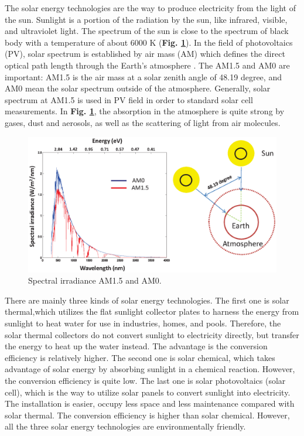\documentclass[a4paper, 12pt, titlepage,oneside,drop]{kthesis}
\begin{document}
The solar energy technologies are the way to produce electricity from the light of the sun. Sunlight is a portion of the radiation by the sun, like infrared, visible,
and ultraviolet light. The spectrum of the sun is close to the spectrum of black body with a temperature of about 6000 K (\textbf{Fig. \ref{spectrumsun}}). In the field of photovoltaics (PV), solar spectrum is established
by air mass (AM) which defines the direct optical path length through the Earth's atmosphere \cite{smestad2002optoelectronics}. The AM1.5 and AM0 are important: AM1.5 is the air mass at a solar zenith angle of 48.19 degree, and AM0 mean the solar spectrum 
outside of the atmosphere. Generally, solar spectrum at AM1.5 is used in PV field in order to standard solar cell measurements. In \textbf{Fig. \ref{spectrumsun}}, the absorption in the atmosphere is quite strong by gases,
dust and aerosols, as well as the scattering of light from air molecules.

\begin{figure}[H]
\centering
\includegraphics[scale=0.6]{spectrum.eps}
\caption{Spectral irradiance AM1.5 and AM0.}
\label{spectrumsun}
\end{figure}

There are mainly three kinds of solar energy technologies. The first one is solar thermal,which utilizes the flat sunlight collector plates to harness the energy from sunlight to heat water for use in industries, homes, and pools.
Therefore, the solar thermal collectors do not convert sunlight to electricity directly, but transfer the energy to heat up the water instead. The advantage is the conversion efficiency is relatively higher. The second one is 
solar chemical, which takes advantage of solar energy by absorbing sunlight in a chemical reaction. However, the conversion efficiency is quite low. The last one is solar photovoltaics (solar cell), which is the way
to utilize solar panels to convert sunlight into electricity. The installation is easier, occupy less space and less maintenance compared with solar thermal. The conversion efficiency is higher than solar chemical. However, 
all the three solar energy technologies are environmentally friendly.\cite{reshef2009interval}
\end{document}
